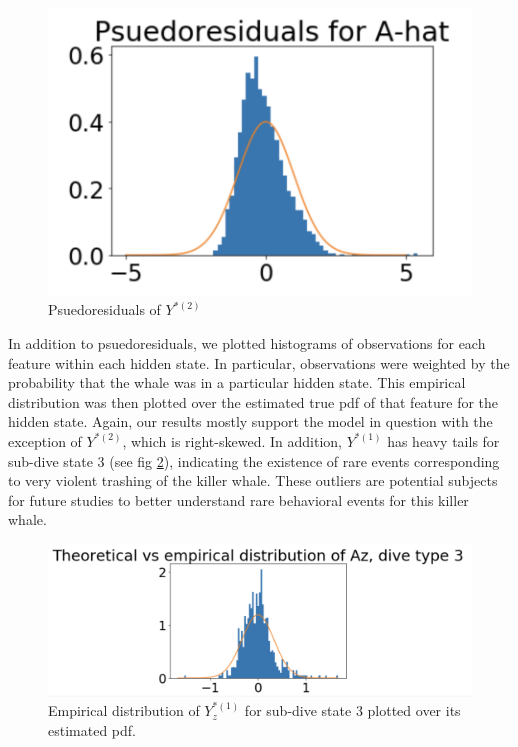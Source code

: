 \begin{figure}[ht]
	\centering
	\includegraphics[width=5in]{../Plots/pseudoresids.png}
	\caption{Psuedoresiduals of $Y^{*(2)}$}
	\label{fig:pseudoresids}
\end{figure}

In addition to psuedoresiduals, we plotted histograms of observations for each feature within each hidden state. In particular, observations were weighted by the probability that the whale was in a particular hidden state. This empirical distribution was then plotted over the estimated true pdf of that feature for the hidden state. Again, our results mostly support the model in question with the exception of $Y^{*(2)}$, which is right-skewed. In addition, $Y^{*(1)}$ has heavy tails for sub-dive state 3 (see fig \ref{fig:empirical_dist}), indicating the existence of rare events corresponding to very violent trashing of the killer whale. These outliers are potential subjects for future studies to better understand rare behavioral events for this killer whale.

\begin{figure}[ht]
	\centering
	\includegraphics[width=5in]{../Plots/empirical_dist.png}
	\caption{Empirical distribution of $Y^{*(1)}_z$ for sub-dive state 3 plotted over its estimated pdf.}
	\label{fig:empirical_dist}
\end{figure}